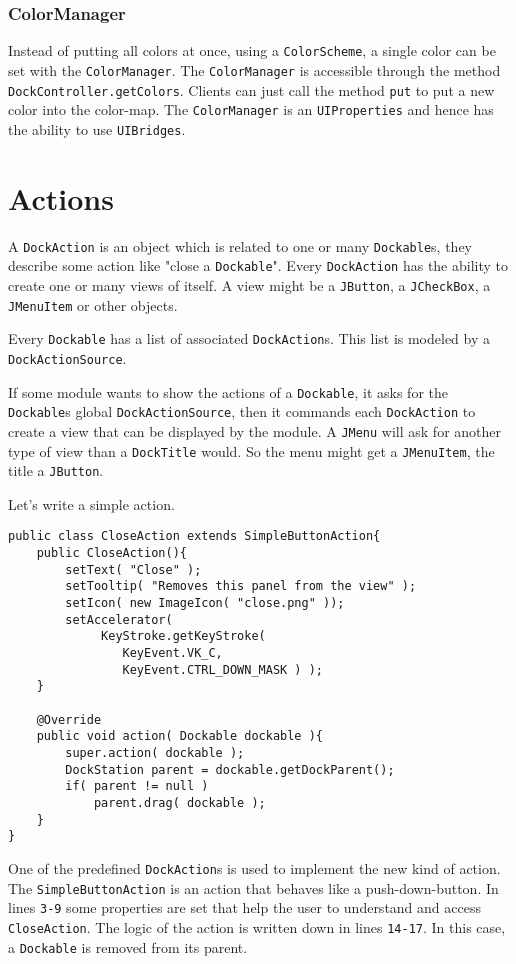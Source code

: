 \documentclass[a4paper,10pt]{article}
\newcommand{\src}[1]{\lstinline[basicstyle=\normalsize\ttfamily,keywordstyle=\normalsize\ttfamily,identifierstyle=\normalsize\ttfamily]|#1|}
\begin{document}
\subsubsection{ColorManager}
Instead of putting all colors at once, using a \src{ColorScheme}, a single color can be set with the \src{ColorManager}. The \src{ColorManager} is accessible through the method \src{DockController.getColors}. Clients can just call the method \src{put} to put a new color into the color-map. The \src{ColorManager} is an \src{UIProperties} and hence has the ability to use \src{UIBridges}.

\section{Actions}
A \src{DockAction} is an object which is related to one or many \src{Dockable}s, they describe some action like "close a \src{Dockable}". Every \src{DockAction} has the ability to create one or many views of itself. A view might be a \src{JButton}, a \src{JCheckBox}, a \src{JMenuItem} or other objects.

Every \src{Dockable} has a list of associated \src{DockAction}s. This list is modeled by a \src{DockActionSource}. 

If some module wants to show the actions of a \src{Dockable}, it asks for the \src{Dockable}s global \src{DockActionSource}, then it commands each \src{DockAction} to create a view that can be displayed by the module. A \src{JMenu} will ask for another type of view than a \src{DockTitle} would. So the menu might get a \src{JMenuItem}, the title a \src{JButton}.

Let's write a simple action.
\begin{lstlisting}
public class CloseAction extends SimpleButtonAction{
	public CloseAction(){
		setText( "Close" );
		setTooltip( "Removes this panel from the view" );
		setIcon( new ImageIcon( "close.png" ));
		setAccelerator(
			 KeyStroke.getKeyStroke(
				KeyEvent.VK_C,
				KeyEvent.CTRL_DOWN_MASK ) );
	}

	@Override
	public void action( Dockable dockable ){
		super.action( dockable );
		DockStation parent = dockable.getDockParent();
		if( parent != null )
			parent.drag( dockable );
	}
}
\end{lstlisting}
One of the predefined \src{DockAction}s is used to implement the new kind of action. The \src{SimpleButtonAction} is an action that behaves like a push-down-button. In lines \src{3-9} some properties are set that help the user to understand and access \src{CloseAction}. The logic of the action is written down in lines \src{14-17}. In this case, a \src{Dockable} is removed from its parent.
\end{document}
